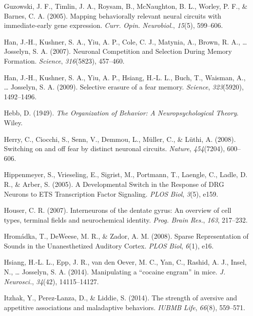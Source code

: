 \documentclass[12pt,a4paperpaper,]{report}
\begin{document}
\hypertarget{ref-guzowskiux5fmappingux5f2005}{}
Guzowski, J. F., Timlin, J. A., Roysam, B., McNaughton, B. L., Worley,
P. F., \& Barnes, C. A. (2005). Mapping behaviorally relevant neural
circuits with immediate-early gene expression. \emph{Curr. Opin.
Neurobiol.}, \emph{15}(5), 599--606.

\hypertarget{ref-hanux5fneuronalux5f2007}{}
Han, J.-H., Kushner, S. A., Yiu, A. P., Cole, C. J., Matynia, A., Brown,
R. A., \ldots{} Josselyn, S. A. (2007). Neuronal Competition and
Selection During Memory Formation. \emph{Science}, \emph{316}(5823),
457--460.

\hypertarget{ref-hanux5fselectiveux5f2009}{}
Han, J.-H., Kushner, S. A., Yiu, A. P., Hsiang, H.-L. L., Buch, T.,
Waisman, A., \ldots{} Josselyn, S. A. (2009). Selective erasure of a
fear memory. \emph{Science}, \emph{323}(5920), 1492--1496.

\hypertarget{ref-hebbux5forganizationux5f1949}{}
Hebb, D. (1949). \emph{The Organization of Behavior: A
Neuropsychological Theory}. Wiley.

\hypertarget{ref-herryux5fswitchingux5f2008-1}{}
Herry, C., Ciocchi, S., Senn, V., Demmou, L., Müller, C., \& Lüthi, A.
(2008). Switching on and off fear by distinct neuronal circuits.
\emph{Nature}, \emph{454}(7204), 600--606.

\hypertarget{ref-hippenmeyerux5fdevelopmentalux5f2005}{}
Hippenmeyer, S., Vrieseling, E., Sigrist, M., Portmann, T., Laengle, C.,
Ladle, D. R., \& Arber, S. (2005). A Developmental Switch in the
Response of DRG Neurons to ETS Transcription Factor Signaling.
\emph{PLOS Biol}, \emph{3}(5), e159.

\hypertarget{ref-houserux5finterneuronsux5f2007}{}
Houser, C. R. (2007). Interneurons of the dentate gyrus: An overview of
cell types, terminal fields and neurochemical identity. \emph{Prog.
Brain Res.}, \emph{163}, 217--232.

\hypertarget{ref-hromadkaux5fsparseux5f2008}{}
Hromádka, T., DeWeese, M. R., \& Zador, A. M. (2008). Sparse
Representation of Sounds in the Unanesthetized Auditory Cortex.
\emph{PLOS Biol}, \emph{6}(1), e16.

\hypertarget{ref-hsiangux5fmanipulatingux5f2014}{}
Hsiang, H.-L. L., Epp, J. R., van den Oever, M. C., Yan, C., Rashid, A.
J., Insel, N., \ldots{} Josselyn, S. A. (2014). Manipulating a ``cocaine
engram'' in mice. \emph{J. Neurosci.}, \emph{34}(42), 14115--14127.

\hypertarget{ref-itzhakux5fstrengthux5f2014}{}
Itzhak, Y., Perez-Lanza, D., \& Liddie, S. (2014). The strength of
aversive and appetitive associations and maladaptive behaviors.
\emph{IUBMB Life}, \emph{66}(8), 559--571.
\end{document}
